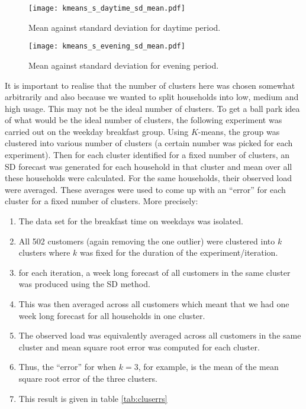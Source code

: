 \documentclass[a4paper]{article}
\begin{document}
\begin{figure}
\centering
\texttt{[image: kmeans\_s\_daytime\_sd\_mean.pdf]}
\caption{\label{fig:kmeans_day_sm}Mean against standard deviation for daytime period.}
\end{figure}

\begin{figure}
\centering
\texttt{[image: kmeans\_s\_evening\_sd\_mean.pdf]}
\caption{\label{fig:kmeans_eve_sm}Mean against standard deviation for evening period.}
\end{figure}

It is important to realise that the number of clusters here was chosen somewhat arbitrarily and also because we wanted to split households into low, medium and high usage. This may not be the ideal number of clusters. To get a ball park idea of what would be the ideal number of clusters, the following experiment was carried out on the weekday breakfast group. Using $K$-means, the group was clustered into various number of clusters (a certain number was picked for each experiment). Then for each cluster identified for a fixed number of clusters, an SD forecast was generated for each household in that cluster and mean over all these households were calculated. For the same households, their observed load were averaged. These averages were used to come up with an ``error'' for each cluster for a fixed number of clusters. More precisely:
\begin{enumerate} \label{k_errs}
\item The data set for the breakfast time on weekdays was isolated.
\item All 502 customers (again removing the one outlier) were clustered into $k$ clusters where $k$ was fixed for the duration of the experiment/iteration.
\item for each iteration, a week long forecast of all customers in the same cluster was produced using the SD method.
\item This was then averaged across all customers which meant that we had one week long forecast for all households in one cluster.
\item The observed load was equivalently averaged across all customers in the same cluster and mean square root error was computed for each cluster.
\item Thus, the ``error'' for when $k=3$, for example, is the mean of the mean square root error of the three clusters.
\item This result is given in table \ref{tab:cluserrs}
\end{enumerate}
\end{document}

